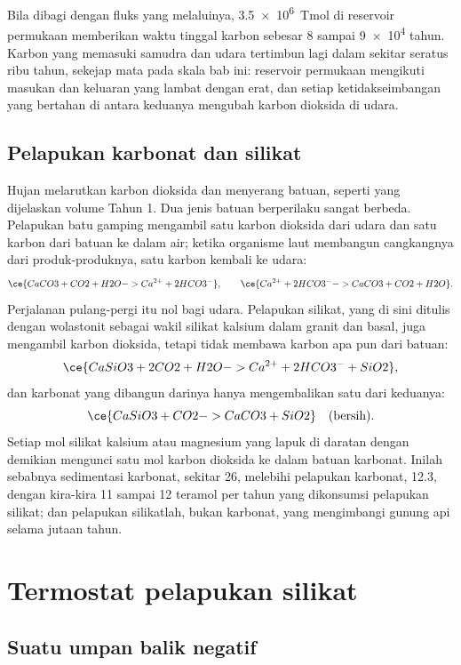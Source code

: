 Bila dibagi dengan fluks yang melaluinya, \qty{3.5e6}{Tmol} di reservoir permukaan memberikan
waktu tinggal karbon sebesar 8 sampai \num{9e4} tahun. Karbon yang memasuki samudra dan udara tertimbun
lagi dalam sekitar seratus ribu tahun, sekejap mata pada skala bab ini: reservoir
permukaan mengikuti masukan dan keluaran yang lambat dengan erat, dan setiap ketidakseimbangan yang bertahan di antara keduanya
mengubah karbon dioksida di udara.

\subsection*{Pelapukan karbonat dan silikat}

Hujan melarutkan karbon dioksida dan menyerang batuan, seperti yang dijelaskan volume Tahun 1. Dua jenis batuan
berperilaku sangat berbeda. Pelapukan batu gamping mengambil satu karbon dioksida dari udara dan satu
karbon dari batuan ke dalam air; ketika organisme laut membangun cangkangnya dari produk-produknya,
satu karbon kembali ke udara:
\[
  \ce{CaCO3 + CO2 + H2O -> Ca^{2+} + 2 HCO3^-} , \qquad
  \ce{Ca^{2+} + 2 HCO3^- -> CaCO3 + CO2 + H2O} .
\]
Perjalanan pulang-pergi itu nol bagi udara. Pelapukan silikat, yang di sini ditulis dengan wolastonit sebagai
wakil silikat kalsium dalam granit dan basal, juga mengambil karbon dioksida, tetapi tidak membawa
karbon apa pun dari batuan:
\[
  \ce{CaSiO3 + 2 CO2 + H2O -> Ca^{2+} + 2 HCO3^- + SiO2} ,
\]
dan karbonat yang dibangun darinya hanya mengembalikan satu dari keduanya:
\[
  \ce{CaSiO3 + CO2 -> CaCO3 + SiO2} \quad\text{(bersih)} .
\]
Setiap mol silikat kalsium atau magnesium yang lapuk di daratan dengan demikian mengunci satu mol karbon dioksida
ke dalam batuan karbonat. Inilah sebabnya sedimentasi karbonat, sekitar 26, melebihi pelapukan karbonat,
12.3, dengan kira-kira 11 sampai 12 teramol per tahun yang dikonsumsi pelapukan silikat; dan pelapukan
silikatlah, bukan karbonat, yang mengimbangi gunung api selama jutaan tahun.

\section{Termostat pelapukan silikat}\label{sec:b2:deep-time-climate:thermostat}

\subsection*{Suatu umpan balik negatif}

